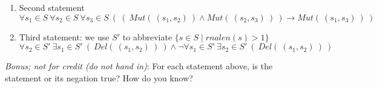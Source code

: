 \documentclass[12pt, oneside]{article}
\begin{document}
\begin{enumerate}
\begin{enumerate}
 \item Second statement
 \[
 \forall s_1 \in S ~ \forall s_2 \in S ~\forall s_3 \in S ~\left( ~\left(~Mut(~(s_1,s_2)~) \land Mut(~(s_2, s_3)~) ~\right) \to Mut(~(s_1,s_3)~)~\right)
 \]
 
 \item Third statement: we use $S'$ to abbreviate $\{ s\in S \mid rnalen(s) > 1\}$
 \[
 \forall s_2 \in S' ~\exists s_1 \in S'~\left(~ Del(~(s_1,s_2)~)~\right) 
 \land \lnot \forall s_1 \in S' ~\exists s_2 \in S'~\left(~ Del(~(s_1,s_2)~)~\right) 
 \]
 \end{enumerate}

 {\it Bonus; not for credit (do not hand in)}:  For each statement above, is the statement or its negation true? How do you know?
 
 
\end{enumerate}
\end{document}
